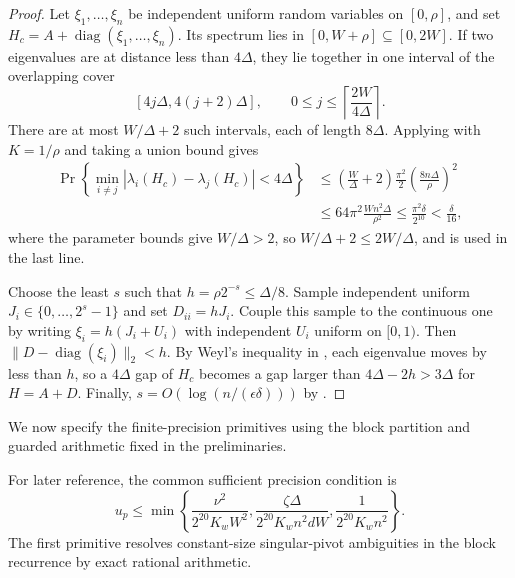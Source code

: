 \documentclass[11pt]{article}
\begin{document}
\begin{proof}
Let $\xi_1,\ldots,\xi_n$ be independent uniform random variables on
$[0,\rho]$, and set
$H_c=A+\operatorname{diag}(\xi_1,\ldots,\xi_n)$.  Its spectrum lies in
$[0,W+\rho]\subseteq[0,2W]$.  If two eigenvalues are at distance less than
$4\Delta$, they lie together in one interval of the overlapping cover
\[
 [4j\Delta,4(j+2)\Delta],
 \qquad
 0\leq j\leq\left\lceil\frac{2W}{4\Delta}\right\rceil.
\]
There are at most $W/\Delta+2$ such intervals, each of length $8\Delta$.
Applying  with $K=1/\rho$ and taking a union
bound gives
\begin{align*}
 \Pr\!\left\{\min_{i\ne j}|\lambda_i(H_c)-\lambda_j(H_c)|<4\Delta\right\}
 &\leq\left(\frac W\Delta+2\right)
   \frac{\pi^2}{2}\left(\frac{8n\Delta}{\rho}\right)^2\\
 &\leq64\pi^2\frac{Wn^2\Delta}{\rho^2}
 \leq\frac{\pi^2\delta}{2^{10}}<\frac\delta{16},
\end{align*}
where the parameter bounds give $W/\Delta>2$, so
$W/\Delta+2\leq2W/\Delta$, and
 is used in the last line.

Choose the least $s$ such that $h=\rho2^{-s}\leq\Delta/8$.  Sample
independent uniform $J_i\in\{0,\ldots,2^s-1\}$ and set $D_{ii}=hJ_i$.
Couple this sample to the continuous one by writing
$\xi_i=h(J_i+U_i)$ with independent $U_i$ uniform on $[0,1)$.  Then
$\lVert D-\operatorname{diag}(\xi_i)\rVert_2<h$.  By Weyl's inequality in
, each eigenvalue moves by less than $h$, so a $4\Delta$ gap of
$H_c$ becomes a gap larger than $4\Delta-2h>3\Delta$ for $H=A+D$.  Finally,
$s=O(\log(n/(\epsilon\delta)))$ by
.
\end{proof}

We now specify the finite-precision primitives using the block partition and
guarded arithmetic fixed in the preliminaries.

For later reference, the common sufficient precision condition is
\begin{equation}
 \label{eq:primitive-precision}
 u_p\leq\min\left\{
  \frac{\nu^2}{2^{20}K_wW^2},
  \frac{\zeta\Delta}{2^{20}K_wn^2dW},
  \frac{1}{2^{20}K_wn^2}
 \right\}.
\end{equation}
The first primitive resolves constant-size singular-pivot ambiguities in the
block recurrence by exact rational arithmetic.
\end{document}
